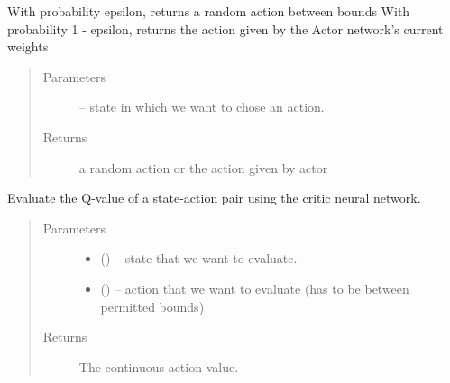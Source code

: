 \documentclass[letterpaper,10pt,english]{sphinxmanual}
\begin{document}
\begin{fulllineitems}
\begin{fulllineitems}
\begin{quote}
\begin{description}
\end{description}\end{quote}

\end{fulllineitems}


\begin{fulllineitems}
\label{\detokenize{package2:DDPG.DDPGAgent.act_epsilon_greedy}}
With probability epsilon, returns a random action between bounds
With probability 1 - epsilon, returns the action given by the Actor network's current weights
\begin{quote}\begin{description}
\item[{Parameters}] \leavevmode
{} -- state in which we want to chose an action.

\item[{Returns}] \leavevmode
a random action or the action given by actor

\end{description}\end{quote}

\end{fulllineitems}


\begin{fulllineitems}
\label{\detokenize{package2:DDPG.DDPGAgent.evaluate}}
Evaluate the Q-value of a state-action pair  using the critic neural network.
\begin{quote}\begin{description}
\item[{Parameters}] \leavevmode\begin{itemize}
\item {} 
 () -- state that we want to evaluate.

\item {} 
 () -- action that we want to evaluate (has to be between permitted bounds)

\end{itemize}

\item[{Returns}] \leavevmode
The continuous action value.


\end{description}
\end{quote}
\end{fulllineitems}
\end{fulllineitems}
\end{document}
